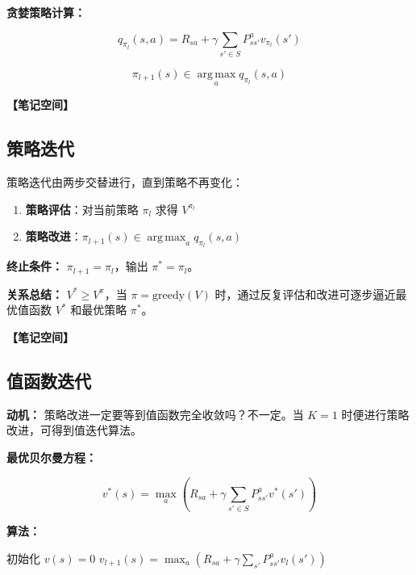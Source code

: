 \documentclass[12pt,a4paper]{article}
\newcommand{\notespace}[1][3cm]{%
  \vspace{#1}%
  \noindent\textbf{【笔记空间】}%
  \vspace{#1}%
}
\newcommand{\1}{\mathbf{1}}
\newcommand{\argmax}{\operatorname*{arg\,max}}
\begin{document}
\textbf{贪婪策略计算：}

\begin{equation}
q_{\pi_l}(s,a)=R_{sa}+\gamma\sum_{s'\in S}P_{ss'}^a v_{\pi_l}(s')
\end{equation}

\begin{equation}
\pi_{l+1}(s)\in \argmax_a q_{\pi_l}(s,a)
\end{equation}

\notespace[2cm]

\subsection{策略迭代}

\begin{keybox}
策略迭代由两步交替进行，直到策略不再变化：
\begin{enumerate}[leftmargin=1.5em]
  \item \textbf{策略评估}：对当前策略 $\pi_l$ 求得 $V^{\pi_l}$
  \item \textbf{策略改进}：$\pi_{l+1}(s)\in \argmax_a q_{\pi_l}(s,a)$
\end{enumerate}
\end{keybox}

\textbf{终止条件：} $\pi_{l+1}=\pi_l$，输出 $\pi^*=\pi_l$。

\textbf{关系总结：} $V^* \ge V^{\pi}$，当 $\pi = \text{greedy}(V)$ 时，通过反复评估和改进可逐步逼近最优值函数 $V^*$ 和最优策略 $\pi^*$。

\notespace[2cm]

\subsection{值函数迭代}

\textbf{动机：} 策略改进一定要等到值函数完全收敛吗？不一定。当 $K=1$ 时便进行策略改进，可得到值迭代算法。

\textbf{最优贝尔曼方程：}

\begin{equation}
v^*(s)=\max_a\left( R_{sa}+\gamma\sum_{s'\in S}P_{ss'}^a v^*(s') \right)
\end{equation}

\textbf{算法：}

\begin{algorithmic}[1]
\State 初始化 $v(s)=0$
\Repeat
    \State $v_{l+1}(s) = \max_a \left(R_{sa} + \gamma \sum_{s'} P_{ss'}^a v_l(s')\right)$
  \EndFor
{}
\end{algorithmic}
\end{document}
